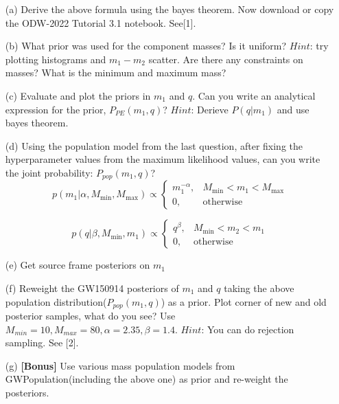 \documentclass{article} %
\begin{document}
\begin{enumerate}
 	\item[(a)] Derive the above formula using the bayes theorem. Now download or copy the ODW-2022 Tutorial 3.1 notebook. See[1]. 

	\item[(b)] What prior was used for the component masses? Is it uniform? $Hint$: try plotting histograms and $m_1-m_2$ scatter. Are there any constraints on masses? What is the minimum and maximum mass? 
	\item[(c)] Evaluate and plot the priors in $m_1$ and $q$. Can you write an analytical expression for the prior, $P_{PE}(m_1,q)$? $Hint$: Derieve $P(q|m_1)$ and use bayes theorem.
	\item[(d)] Using the population model from the last question, after fixing the hyperparameter values from the maximum likelihood values, can you write the joint probability: $P_{pop}(m_1,q)$? \\ 
\begin{equation}
  p(m_1|\alpha, M_\mathrm{min}, M_\mathrm{max}) \propto \begin{cases} m_1 ^ {-\alpha}, & M_\mathrm{min} < m_1 < M_\mathrm{max} \\ 0, & \mathrm{otherwise}\end{cases}  
\end{equation}

\begin{equation}
    p(q|\beta, M_\mathrm{min}, m_1) \propto \begin{cases}
q ^ {\beta},  & M_\mathrm{min} < m_2 < m_1 \\ 
0, & \mathrm{otherwise}
\end{cases}
\end{equation}

\item[(e)] Get source frame posteriors on $m_1$

\item[(f)] Reweight the GW150914 posteriors of $m_1$ and $q$ taking the above population distribution($P_{pop}(m_1,q)$) as a prior. Plot corner of new and old posterior samples, what do you see? Use $M_{min} = 10,  M_{max} = 80, \alpha = 2.35, \beta = 1.4$. $Hint$: You can do rejection sampling. See [2]. 

\item[(g)]\textbf{[Bonus]} Use various mass population models from GWPopulation(including the above one) as prior and re-weight the posteriors.


\end{enumerate}
\end{document}
